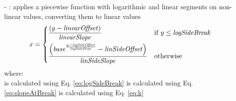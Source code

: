 \begin{xmlfields}
\begin{itemize}
            \item[-] : applies a piecewise function with logarithmic and linear segments on non-linear values, converting them to linear values
            \begin{equation} \label{eq:camLogToLin}
                x = 
                \begin{dcases}
                    \frac{(y - \text{\emph{linearOffset}})}{\text{\emph{linearSlope}}} & \text{if } y \leq \text{\emph{logSideBreak}} \\
                    \frac{\left(\text{\emph{base}}^{\frac{y-\text{\emph{logSideOffset}}}{\text{\emph{logSideSlope}}}} - \text{\emph{linSideOffset}}\right)}{\text{\emph{linSideSlope}}} & \text{otherwise}
                \end{dcases}
            \end{equation}
            \tabto{0.5in} where: \\
                \tabto{0.75in}  is calculated using Eq. \ref{eq:logSideBreak}
                \tabto{0.75in}  is calculated using Eq. \ref{eq:slopeAtBreak}
                \tabto{0.75in}  is calculated using Eq. \ref{eq:k}

        \end{itemize}
\end{xmlfields}

